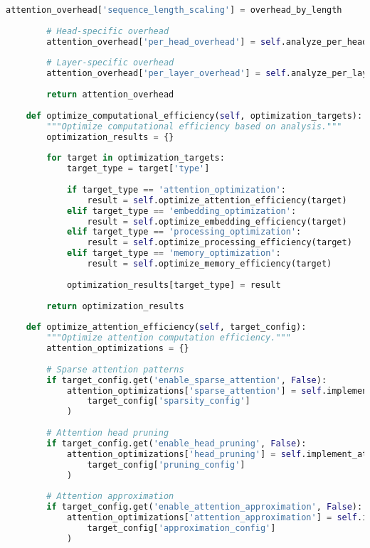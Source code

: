 \begin{lstlisting}[language=Python, caption=Comprehensive computational efficiency optimization framework]
        attention_overhead['sequence_length_scaling'] = overhead_by_length
        
        # Head-specific overhead
        attention_overhead['per_head_overhead'] = self.analyze_per_head_overhead()
        
        # Layer-specific overhead
        attention_overhead['per_layer_overhead'] = self.analyze_per_layer_overhead()
        
        return attention_overhead
    
    def optimize_computational_efficiency(self, optimization_targets):
        """Optimize computational efficiency based on analysis."""
        optimization_results = {}
        
        for target in optimization_targets:
            target_type = target['type']
            
            if target_type == 'attention_optimization':
                result = self.optimize_attention_efficiency(target)
            elif target_type == 'embedding_optimization':
                result = self.optimize_embedding_efficiency(target)
            elif target_type == 'processing_optimization':
                result = self.optimize_processing_efficiency(target)
            elif target_type == 'memory_optimization':
                result = self.optimize_memory_efficiency(target)
            
            optimization_results[target_type] = result
        
        return optimization_results
    
    def optimize_attention_efficiency(self, target_config):
        """Optimize attention computation efficiency."""
        attention_optimizations = {}
        
        # Sparse attention patterns
        if target_config.get('enable_sparse_attention', False):
            attention_optimizations['sparse_attention'] = self.implement_sparse_attention(
                target_config['sparsity_config']
            )
        
        # Attention head pruning
        if target_config.get('enable_head_pruning', False):
            attention_optimizations['head_pruning'] = self.implement_attention_head_pruning(
                target_config['pruning_config']
            )
        
        # Attention approximation
        if target_config.get('enable_attention_approximation', False):
            attention_optimizations['attention_approximation'] = self.implement_attention_approximation(
                target_config['approximation_config']
            )
        

\end{lstlisting}
